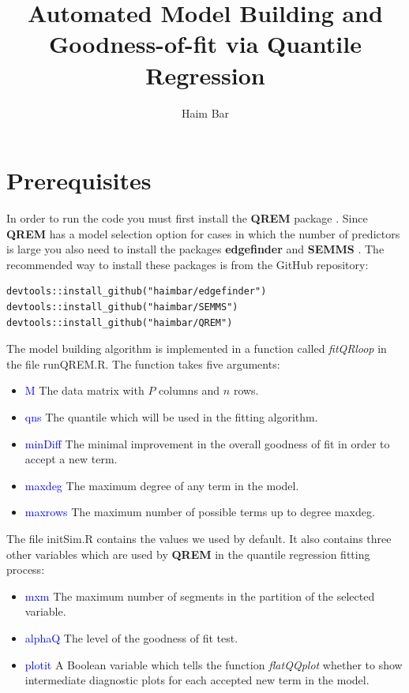 \documentclass[a4paper,12pt]{article}
\title{Automated Model Building and Goodness-of-fit via Quantile Regression}
\author{Haim Bar}
\newcommand{\func}[1]{\textit{#1}}
\newcommand{\pkg}[1]{\textbf{#1}}
\begin{document}
\maketitle
{}

\section{Prerequisites}
In order to run the code you must first install the \pkg{QREM} package \cite{QREM}. Since \pkg{QREM} has a model selection option for cases in which the number of predictors is large you also need to install the packages \pkg{edgefinder} \cite{PlosOne2021} and \pkg{SEMMS} \cite{SEMMS}. The recommended way to install these packages is from the GitHub repository:

\begin{Verbatim}
devtools::install_github("haimbar/edgefinder")
devtools::install_github("haimbar/SEMMS")
devtools::install_github("haimbar/QREM")
\end{Verbatim}

The model building algorithm is implemented in a function called \func{fitQRloop} in the file runQREM.R. The function takes five arguments:
\begin{itemize}
 \item \textcolor{blue}{M} The data matrix with $P$ columns and $n$ rows.
 \item \textcolor{blue}{qns} The quantile which will be used in the fitting algorithm.
 \item \textcolor{blue}{minDiff} The minimal improvement in the overall goodness of fit in order to accept a new term.
 \item \textcolor{blue}{maxdeg} The maximum degree of any term in the model.
 \item \textcolor{blue}{maxrows} The maximum number of possible terms up to degree maxdeg.
\end{itemize}
The file initSim.R contains the values we used by default. It also contains three other variables which are used by \pkg{QREM} in the quantile regression fitting process:
\begin{itemize}
 \item \textcolor{blue}{mxm} The maximum number of segments in the partition of the selected variable.
 \item \textcolor{blue}{alphaQ} The level of the goodness of fit test.
 \item \textcolor{blue}{plotit} A Boolean variable which tells the function \func{flatQQplot} whether to show intermediate diagnostic plots for each accepted new term in the model.
\end{itemize}
\end{document}
